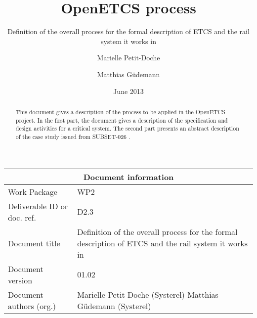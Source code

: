 \documentclass{template/openetcs_article}
\begin{document}
\frontmatter
{}




\title{OpenETCS process}

\subtitle{Definition of the overall process for the formal description of ETCS and the rail system it works in}

\date{June 2013}


\author{Marielle Petit-Doche}

\author{Matthias Güdemann}

 


\begin{abstract}
This document gives a description of the process to be applied in the OpenETCS project. In the first part, the document gives a description of the specification and design activities for a critical system. The second part presents an abstract description of the case study issued from SUBSET-026 \cite{unisig_subset-026_2012}.

\end{abstract}

\maketitle
\tableofcontents
\listoffiguresandtables
\newpage


\begin{tabular}{|p{4.4cm}|p{8.7cm}|}
\hline
\multicolumn{2}{|c|}{Document information} \\
\hline
Work Package &  WP2  \\
Deliverable ID or doc. ref. & D2.3\\
\hline
Document title & Definition of the overall process for the formal description of ETCS and the rail system it works in \\
Document version & 01.02 \\
Document authors (org.)  & Marielle Petit-Doche (Systerel) Matthias Güdemann (Systerel) \\
\hline
\end{tabular}
\end{document}
